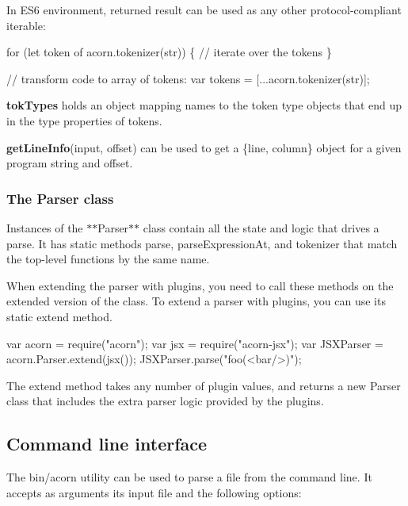 In E\+S6 environment, returned result can be used as any other protocol-\/compliant iterable\+:


\begin{DoxyCode}
for (let token of acorn.tokenizer(str)) \{
  // iterate over the tokens
\}

// transform code to array of tokens:
var tokens = [...acorn.tokenizer(str)];
\end{DoxyCode}


{\bfseries tok\+Types} holds an object mapping names to the token type objects that end up in the {\ttfamily type} properties of tokens.

{\bfseries get\+Line\+Info}{\ttfamily (input, offset)} can be used to get a {\ttfamily \{line, column\}} object for a given program string and offset.

\subsubsection*{The {\ttfamily Parser} class}

Instances of the $\ast$$\ast${\ttfamily Parser}$\ast$$\ast$ class contain all the state and logic that drives a parse. It has static methods {\ttfamily parse}, {\ttfamily parse\+Expression\+At}, and {\ttfamily tokenizer} that match the top-\/level functions by the same name.

When extending the parser with plugins, you need to call these methods on the extended version of the class. To extend a parser with plugins, you can use its static {\ttfamily extend} method.


\begin{DoxyCode}
var acorn = require("acorn");
var jsx = require("acorn-jsx");
var JSXParser = acorn.Parser.extend(jsx());
JSXParser.parse("foo(<bar/>)");
\end{DoxyCode}


The {\ttfamily extend} method takes any number of plugin values, and returns a new {\ttfamily Parser} class that includes the extra parser logic provided by the plugins.

\subsection*{Command line interface}

The {\ttfamily bin/acorn} utility can be used to parse a file from the command line. It accepts as arguments its input file and the following options\+:


